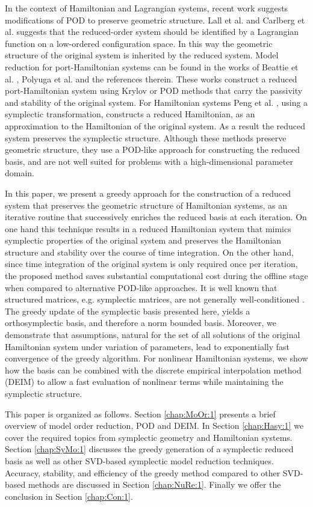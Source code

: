 In the context of Hamiltonian and Lagrangian systems, recent work suggests modifications of POD to preserve geometric structure. Lall et al. \cite{Lall:2003iy} and Carlberg et al. \cite{Carlberg:2014ky} suggests that the reduced-order system should be identified by a Lagrangian function on a low-ordered configuration space. In this way the geometric structure of the original system is inherited by the reduced system. {\edit Model reduction for port-Hamiltonian systems can be found in the works of Beattie et al. \cite{Chaturantabut:2016he}, Polyuga et al. \cite{Polyuga:2010gj} and the references therein. These works construct a reduced port-Hamiltonian system using Krylov or POD methods that carry the passivity and stability of the original system.} For Hamiltonian systems Peng et al. \cite{Peng:2014di}, using a symplectic transformation, constructs a reduced Hamiltonian, as an approximation to the Hamiltonian of the original system. As a result the reduced system preserves the symplectic structure. Although these methods preserve geometric structure, they use a POD-like approach for constructing the reduced basis, and are not well {\edit suited} for problems with a high-dimensional parameter domain.

In this paper, we present a greedy approach for the construction of a reduced system that preserves the geometric structure of Hamiltonian systems, as an iterative routine that successively enriches the reduced basis at each iteration. On one hand this technique results in a reduced Hamiltonian system that mimics symplectic properties of the original system and preserves the Hamiltonian structure and stability over the course of time integration. On the other hand, since time integration of the original system is only required once per iteration, the proposed method saves substantial computational cost during the offline stage when compared to alternative POD-like approaches. {\edit It is well known that structured matrices, e.g. symplectic matrices, are not generally well-conditioned \cite{Karow:2006cf}. The greedy update of the symplectic basis presented here, yields a orthosymplectic basis, and therefore a norm bounded basis.} Moreover, we demonstrate that assumptions, natural for the set of all solutions of the original Hamiltonian system under variation of parameters, lead to exponentially fast convergence of the greedy algorithm. For nonlinear Hamiltonian systems, we show how the basis can be combined with the discrete empirical interpolation method (DEIM) {\edit \cite{Chaturantabut:2010cz,Barrault:2004kz}} to allow a fast evaluation of nonlinear terms while maintaining the symplectic structure.

This paper is organized as follows. Section \ref{chap:MoOr:1} presents a brief overview of model order reduction, POD and DEIM. In Section \ref{chap:Hasy:1} we cover the required topics from symplectic geometry and Hamiltonian systems. Section \ref{chap:SyMo:1} discusses the greedy generation of a symplectic reduced basis as well as other SVD-based symplectic model reduction techniques. Accuracy, stability, and efficiency of the greedy method compared to other SVD-based methods are discussed in Section \ref{chap:NuRe:1}. Finally we offer the conclusion in Section \ref{chap:Con:1}.
